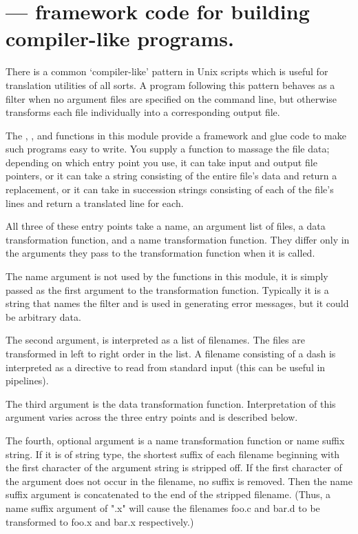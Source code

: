 \section{ ---
         framework code for building compiler-like programs.}


There is a common `compiler-like' pattern in Unix scripts which is useful
for translation utilities of all sorts.  A program following this pattern
behaves as a filter when no argument files are specified on the command
line, but otherwise transforms each file individually into a corresponding
output file.

The , , and
 functions in this module provide a framework and
glue code to make such programs easy to write.  You supply a function
to massage the file data; depending on which entry point you use, it
can take input and output file pointers, or it can take a string
consisting of the entire file's data and return a replacement, or it
can take in succession strings consisting of each of the file's lines
and return a translated line for each.

All three of these entry points take a name, an argument list of files,
a data transformation function, and a name transformation function.
They differ only in the arguments they pass to the transformation
function when it is called.

The name argument is not used by the functions in this module, it is
simply passed as the first argument to the transformation function. 
Typically it is a string that names the filter and is used in
generating error messages, but it could be arbitrary data.

The second argument, is interpreted as a list of filenames.  The files
are transformed in left to right order in the list. A filename
consisting of a dash is interpreted as a directive to read from
standard input (this can be useful in pipelines).

The third argument is the data transformation function.
Interpretation of this argument varies across the three 
entry points and is described below.

The fourth, optional argument is a name transformation function or
name suffix string.  If it is of string type, the shortest suffix of each
filename beginning with the first character of the argument string
is stripped off.  If the first character of the argument does not 
occur in the filename, no suffix is removed.  Then the name suffix
argument is concatenated to the end of the stripped filename.  (Thus,
a name suffix argument of ".x" will cause the filenames foo.c and
bar.d to be transformed to foo.x and bar.x respectively.)
  
